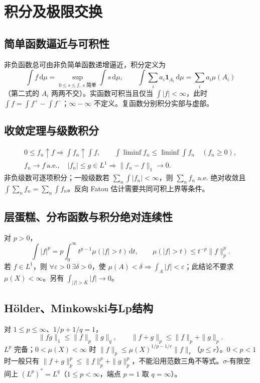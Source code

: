 \documentclass[../main.tex]{subfiles}
\begin{document}
\section{积分及极限交换}
\subsection{简单函数逼近与可积性}
非负函数总可由非负简单函数递增逼近，积分定义为
\[
\int f\,\mathrm d\mu=\sup_{0\le s\le f,\ s\text{ 简单}}\int s\,\mathrm d\mu,
\qquad\int\sum_i a_i\bm1_{A_i}\,\mathrm d\mu=\sum_i a_i\mu(A_i)
\]
（第二式的 $A_i$ 两两不交）。实函数可积当且仅当 $\int|f|<\infty$，此时 $\int f=\int f^+-\int f^-$；$\infty-\infty$ 不定义。复函数分别积分实部与虚部。
\subsection{收敛定理与级数积分}
\begin{gather*}
0\le f_n\uparrow f\Rightarrow\int f_n\uparrow\int f,\qquad
\int\liminf f_n\le\liminf\int f_n\quad(f_n\ge0),\\
f_n\to f\ \text{a.e.},\quad |f_n|\le g\in L^1
\Rightarrow\|f_n-f\|_1\to0.
\end{gather*}
非负级数可逐项积分；一般级数若 $\sum_n\int|f_n|<\infty$，则 $\sum_nf_n$ a.e. 绝对收敛且 $\int\sum_nf_n=\sum_n\int f_n$。反向 Fatou 估计需要共同可积上界等条件。
\subsection{层蛋糕、分布函数与积分绝对连续性}
对 $p>0$，
\[
\int|f|^p=p\int_0^\infty t^{p-1}\mu(|f|>t)\,\mathrm dt,\qquad
\mu(|f|>t)\le t^{-p}\|f\|_p^p.
\]
若 $f\in L^1$，则 $\forall\varepsilon>0\ \exists\delta>0$，使 $\mu(A)<\delta\Rightarrow\int_A|f|<\varepsilon$；此结论不要求 $\mu(X)<\infty$。另有 $\int_{|f|>K}|f|\to0$。
\subsection{Hölder、Minkowski与Lp结构}
对 $1\le p\le\infty$、$1/p+1/q=1$，
\[
\|fg\|_1\le\|f\|_p\|g\|_q,\qquad
\|f+g\|_p\le\|f\|_p+\|g\|_p.
\]
$L^p$ 完备；$0<\mu(X)<\infty$ 时 $\|f\|_p\le\mu(X)^{1/p-1/r}\|f\|_r$（$p\le r$）。$0<p<1$ 时一般只有 $\|f+g\|_p^p\le\|f\|_p^p+\|g\|_p^p$，不能沿用范数三角不等式。$\sigma$-有限空间上 $(L^p)^*=L^q$（$1\le p<\infty$，端点 $p=1$ 取 $q=\infty$）。
\end{document}
